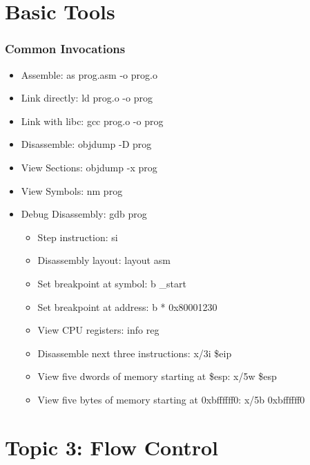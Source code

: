 \documentclass[11pt,xcolor=dvipsnames]{beamer}
\begin{document}
\section{Basic Tools}
\begin{frame}[fragile,t]
\frametitle{Common Invocations}
\begin{itemize}
    \item Assemble: {\ttfamily as prog.asm -o prog.o}
    \item Link directly: {\ttfamily ld prog.o -o prog}
    \item Link with libc: {\ttfamily gcc prog.o -o prog}
    \item Disassemble: {\ttfamily objdump -D prog}
    \item View Sections: {\ttfamily objdump -x prog}
    \item View Symbols: {\ttfamily nm prog}
    \item Debug Disassembly: {\ttfamily gdb prog}
    \begin{itemize}
        \item Step instruction: {\ttfamily si}
        \item Disassembly layout: {\ttfamily layout asm}
        \item Set breakpoint at symbol: {\ttfamily b \_start}
        \item Set breakpoint at address: {\ttfamily b * 0x80001230}
        \item View CPU registers: {\ttfamily info reg}
        \item Disassemble next three instructions: {\ttfamily x/3i \$eip}
        \item View five dwords of memory starting at {\ttfamily \$esp}: {\ttfamily x/5w \$esp}
        \item View five bytes of memory starting at {\ttfamily 0xbffffff0}: {\ttfamily x/5b 0xbffffff0}
    \end{itemize}
\end{itemize}
\end{frame}


\section{Topic 3: Flow Control}
\end{document}
